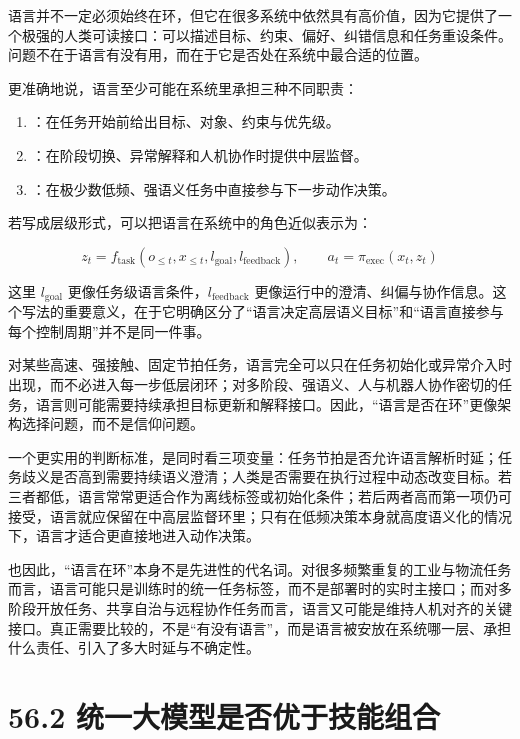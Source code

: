 语言并不一定必须始终在环，但它在很多系统中依然具有高价值，因为它提供了一个极强的人类可读接口：可以描述目标、约束、偏好、纠错信息和任务重设条件。问题不在于语言有没有用，而在于它是否处在系统中最合适的位置。

更准确地说，语言至少可能在系统里承担三种不同职责：

\begin{enumerate}
\item \texttt{}：在任务开始前给出目标、对象、约束与优先级。
\item \texttt{}：在阶段切换、异常解释和人机协作时提供中层监督。
\item \texttt{}：在极少数低频、强语义任务中直接参与下一步动作决策。
\end{enumerate}

若写成层级形式，可以把语言在系统中的角色近似表示为：

\begingroup
\scriptsize
\begin{equation*}
z_t = f_{\text{task}}(o_{\le t}, x_{\le t}, l_{\text{goal}}, l_{\text{feedback}}), \qquad
a_t = \pi_{\text{exec}}(x_t, z_t)
\end{equation*}
\endgroup

这里 \(l_{\text{goal}}\) 更像任务级语言条件，\(l_{\text{feedback}}\) 更像运行中的澄清、纠偏与协作信息。这个写法的重要意义，在于它明确区分了“语言决定高层语义目标”和“语言直接参与每个控制周期”并不是同一件事。

对某些高速、强接触、固定节拍任务，语言完全可以只在任务初始化或异常介入时出现，而不必进入每一步低层闭环；对多阶段、强语义、人与机器人协作密切的任务，语言则可能需要持续承担目标更新和解释接口。因此，“语言是否在环”更像架构选择问题，而不是信仰问题。

一个更实用的判断标准，是同时看三项变量：任务节拍是否允许语言解析时延；任务歧义是否高到需要持续语义澄清；人类是否需要在执行过程中动态改变目标。若三者都低，语言常常更适合作为离线标签或初始化条件；若后两者高而第一项仍可接受，语言就应保留在中高层监督环里；只有在低频决策本身就高度语义化的情况下，语言才适合更直接地进入动作决策。

也因此，“语言在环”本身不是先进性的代名词。对很多频繁重复的工业与物流任务而言，语言可能只是训练时的统一任务标签，而不是部署时的实时主接口；而对多阶段开放任务、共享自治与远程协作任务而言，语言又可能是维持人机对齐的关键接口。真正需要比较的，不是“有没有语言”，而是语言被安放在系统哪一层、承担什么责任、引入了多大时延与不确定性。

\section*{56.2 统一大模型是否优于技能组合}


